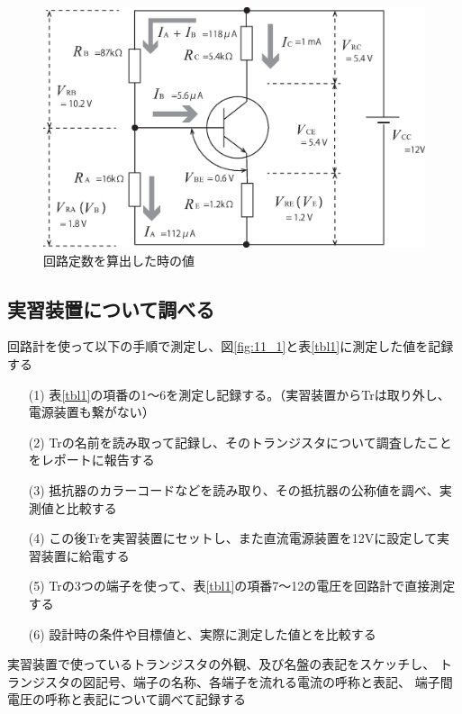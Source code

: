 \documentclass[uplatex,a4paper,11pt,oneside,openany]{jsbook}
\begin{document}
\begin{figure}[H]
  \centering
   \includegraphics[keepaspectratio, scale=0.45, angle=0]
               {figs/eps/p96fig3a.eps}
               \caption{回路定数を算出した時の値}
               \label{fig:11_2}
\end{figure}

\subsection{実習装置について調べる}

回路計を使って以下の手順で測定し、図\ref{fig:11_1}と表\ref{tbl1}に測定した値を記録する

\begin{enumerate}
\item[(1)] 表\ref{tbl1}の項番の1〜6を測定し記録する。（実習装置からTrは取り外し、電源装置も繋がない）
\item[(2)] Trの名前を読み取って記録し、そのトランジスタについて調査したことをレポートに報告する
\item[(3)] 抵抗器のカラーコードなどを読み取り、その抵抗器の公称値を調べ、実測値と比較する
\item[(4)] この後Trを実習装置にセットし、また直流電源装置を12Vに設定して実習装置に給電する
\item[(5)] Trの3つの端子を使って、表\ref{tbl1}の項番7〜12の電圧を回路計で直接測定する
\item[(6)] 設計時の条件や目標値と、実際に測定した値とを比較する
\end{enumerate}

実習装置で使っているトランジスタの外観、及び名盤の表記をスケッチし、
トランジスタの図記号、端子の名称、各端子を流れる電流の呼称と表記、
端子間電圧の呼称と表記について調べて記録する\\
\end{document}
